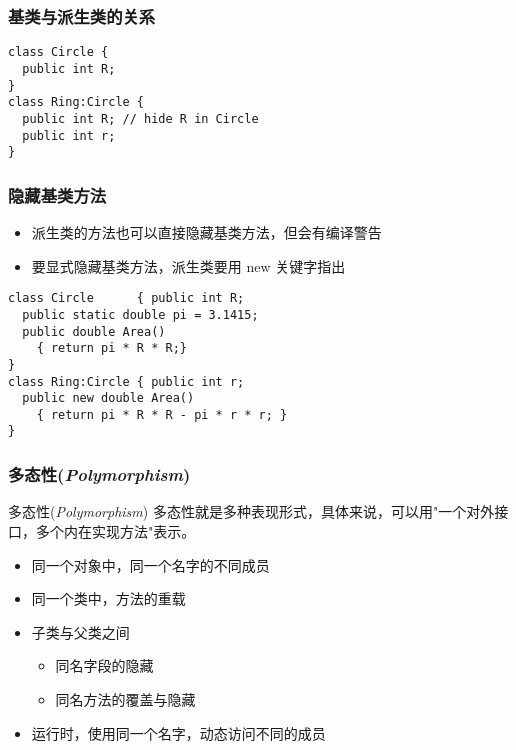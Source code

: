\begin{frame}[fragile]
\frametitle{基类与派生类的关系}
\begin{lstlisting}[escapeinside=<>]
class Circle {
  public int R;
}
class Ring:Circle {
  public int R; // hide R in Circle
  public int r;
}
\end{lstlisting}
\end{frame}

\begin{frame}[fragile]
\frametitle{隐藏基类方法}
\begin{itemize}
\item 派生类的方法也可以直接隐藏基类方法，但会有编译警告
\item 要显式隐藏基类方法，派生类要用 new 关键字指出
\end{itemize}
\begin{lstlisting}
class Circle      { public int R;
  public static double pi = 3.1415;
  public double Area()
    { return pi * R * R;}
}
class Ring:Circle { public int r;
  public new double Area()
    { return pi * R * R - pi * r * r; }
}
\end{lstlisting}

\end{frame}

\begin{frame}
\frametitle{多态性(\textit{Polymorphism})}

\begin{block}{多态性(\textit{Polymorphism})}
  \CJKindent 多态性就是多种表现形式，具体来说，可以用"一个对外接口，多个内在实现方法"表示。
\end{block}

  \begin{itemize}
    \setlength{\itemsep}{8pt plus 1pt}
  \item 同一个对象中，同一个名字的不同成员
  \item 同一个类中，方法的重载
  \item 子类与父类之间
    \begin{itemize}
    \item 同名字段的隐藏
    \item 同名方法的覆盖与隐藏
    \end{itemize}
  \item 运行时，使用同一个名字，动态访问不同的成员
  \end{itemize}
\end{frame}

